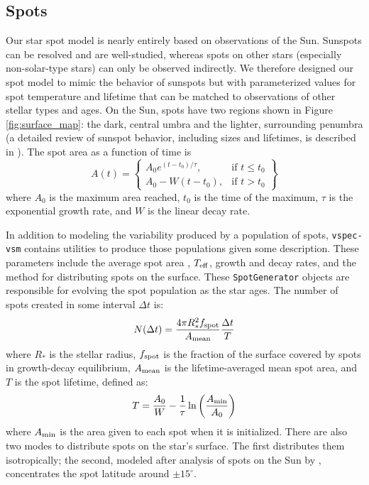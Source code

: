 \documentclass[twocolumn]{aastex631}
\newcommand{\teff}{$T_{\rm eff}$}
\begin{document}
\subsection{Spots \label{subsec:spots}}
Our star spot model is nearly entirely based on observations of the Sun. Sunspots can be resolved and are well-studied, whereas spots on other stars (especially non-solar-type stars) can only be observed indirectly. We therefore designed our spot model to mimic the behavior of sunspots but with parameterized values for spot temperature and lifetime that can be matched to observations of other stellar types and ages. On the Sun, spots have two regions shown in Figure \ref{fig:surface_map}: the dark, central umbra and the lighter, surrounding penumbra (a detailed review of sunspot behavior, including sizes and lifetimes, is described in \citet{solanki2003}). The spot area as a function of time is
\begin{equation}
    A(t) = \left\{
    \begin{array}{lr}
        A_0 e^{(t-t_0)/\tau}, & \text{if } t \leq t_0 \\
        A_0 - W(t-t_0), & \text{if } t > t_0
    \end{array}
    \right\}
\end{equation}
where $A_0$ is the maximum area reached, $t_0$ is the time of the maximum, $\tau$ is the exponential growth rate, and $W$ is the linear decay rate.

In addition to modeling the variability produced by a population of spots, \texttt{vspec-vsm} contains utilities to produce those populations given some description.
These parameters include the average spot area \citep[lognormally distributed, ][]{bogdan1988}, \teff, growth and decay rates, and the method for distributing spots on the surface. These \texttt{SpotGenerator} objects are responsible for evolving the spot population as the star ages. The number of spots created in some interval $\Delta t$ is:
\begin{equation}
    N(\Delta t) = \frac{4 \pi R_*^2 f_{\rm spot}}{A_{\rm mean}} \frac{\Delta t}{T}
\end{equation}
where $R_*$ is the stellar radius, $f_{\rm spot}$ is the fraction of the surface covered by spots in growth-decay equilibrium, $A_{\rm mean}$ is the lifetime-averaged mean spot area, and $T$ is the spot lifetime, defined as:
\begin{equation}
    T = \frac{A_0}{W} - \frac{1}{\tau} \ln{\left (\frac{A_{\rm min}}{A_0}\right )}
\end{equation}
where $A_{\rm min}$ is the area given to each spot when it is initialized. There are also two modes to distribute spots on the star's surface. The first distributes them isotropically; the second, modeled after analysis of spots on the Sun by \citet{mandal2017}, concentrates the spot latitude around $\pm 15^{\circ}$.
\end{document}
